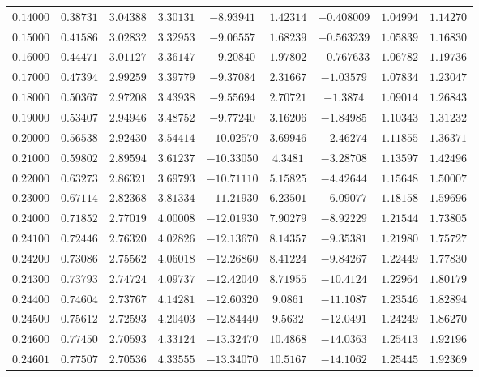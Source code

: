 \documentclass{caosp308}
\begin{document}
\begin{table}[htb]
{{\begin{tabular}{ccccccccc}
$0.14000$ & $0.38731$ & $3.04388$ & $3.30131$ & $-8.93941$ & $1.42314$ & $-0.408009$ & $1.04994$ & $1.14270$\\
$0.15000$ & $0.41586$ & $3.02832$ & $3.32953$ & $-9.06557$ & $1.68239$ & $-0.563239$ & $1.05839$ & $1.16830$\\
$0.16000$ & $0.44471$ & $3.01127$ & $3.36147$ & $-9.20840$ & $1.97802$ & $-0.767633$ & $1.06782$ & $1.19736$\\
$0.17000$ & $0.47394$ & $2.99259$ & $3.39779$ & $-9.37084$ & $2.31667$ & $-1.03579$ & $1.07834$ & $1.23047$\\
$0.18000$ & $0.50367$ & $2.97208$ & $3.43938$ & $-9.55694$ & $2.70721$ & $-1.3874$ & $1.09014$ & $1.26843$\\
$0.19000$ & $0.53407$ & $2.94946$ & $3.48752$ & $-9.77240$ & $3.16206$ & $-1.84985$ & $1.10343$ & $1.31232$\\
$0.20000$ & $0.56538$ & $2.92430$ & $3.54414$ & $-10.02570$ & $3.69946$ & $-2.46274$ & $1.11855$ & $1.36371$\\
$0.21000$ & $0.59802$ & $2.89594$ & $3.61237$ & $-10.33050$ & $4.3481$ & $-3.28708$ & $1.13597$ & $1.42496$\\
$0.22000$ & $0.63273$ & $2.86321$ & $3.69793$ & $-10.71110$ & $5.15825$ & $-4.42644$ & $1.15648$ & $1.50007$\\
$0.23000$ & $0.67114$ & $2.82368$ & $3.81334$ & $-11.21930$ & $6.23501$ & $-6.09077$ & $1.18158$ & $1.59696$\\
$0.24000$ & $0.71852$ & $2.77019$ & $4.00008$ & $-12.01930$ & $7.90279$ & $-8.92229$ & $1.21544$ & $1.73805$\\
$0.24100$ & $0.72446$ & $2.76320$ & $4.02826$ & $-12.13670$ & $8.14357$ & $-9.35381$ & $1.21980$ & $1.75727$\\
$0.24200$ & $0.73086$ & $2.75562$ & $4.06018$ & $-12.26860$ & $8.41224$ & $-9.84267$ & $1.22449$ & $1.77830$\\
$0.24300$ & $0.73793$ & $2.74724$ & $4.09737$ & $-12.42040$ & $8.71955$ & $-10.4124$ & $1.22964$ & $1.80179$\\
$0.24400$ & $0.74604$ & $2.73767$ & $4.14281$ & $-12.60320$ & $9.0861$ & $-11.1087$ & $1.23546$ & $1.82894$\\
$0.24500$ & $0.75612$ & $2.72593$ & $4.20403$ & $-12.84440$ & $9.5632$ & $-12.0491$ & $1.24249$ & $1.86270$\\
$0.24600$ & $0.77450$ & $2.70593$ & $4.33124$ & $-13.32470$ & $10.4868$ & $-14.0363$ & $1.25413$ & $1.92196$\\
$0.24601$ & $0.77507$ & $2.70536$ & $4.33555$ & $-13.34070$ & $10.5167$ & $-14.1062$ & $1.25445$ & $1.92369$\\

\end{tabular}}}
\end{table}
\end{document}
